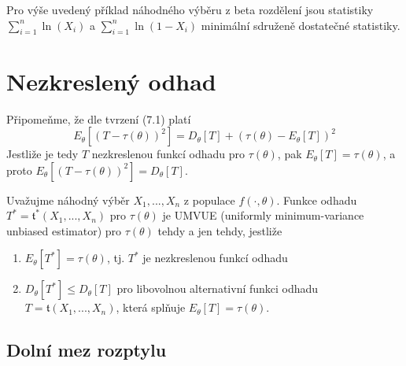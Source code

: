\begin{example}
Pro výše uvedený příklad náhodného výběru z beta rozdělení jsou statistiky $\sum_{i = 1}^n \ln (X_i)$ a $\sum_{i = 1}^n \ln(1 - X_i)$ minimální sdruženě dostatečné statistiky.
\end{example}

\section{Nezkreslený odhad}
 
Připomeňme, že dle tvrzení (7.1) platí
\begin{equation*}
E_{\theta}[(T - \tau(\theta))^2] = D_{\theta}[T] + (\tau(\theta) - E_{\theta}[T])^2
\end{equation*}
Jestliže je tedy $T$ nezkreslenou funkcí odhadu pro $\tau(\theta)$, pak $E_{\theta}[T] = \tau(\theta)$, a proto $E_{\theta}[(T - \tau(\theta))^2] = D_{\theta}[T]$.

\begin{definition}
Uvažujme náhodný výběr $X_1, ..., X_n$ z populace $f(\cdot, \theta)$. Funkce odhadu $T^* = \mathfrak{t}^*(X_1, ..., X_n)$ pro $\tau(\theta)$ je UMVUE (uniformly minimum-variance unbiased estimator) pro $\tau(\theta)$ tehdy a jen tehdy, jestliže
\begin{enumerate}
\item $E_{\theta}[T^*] = \tau(\theta)$, tj. $T^*$ je nezkreslenou funkcí odhadu
\item $D_{\theta}[T^*] \le D_{\theta}[T]$ pro libovolnou alternativní funkci odhadu $T = \mathfrak{t}(X_1, ..., X_n)$, která splňuje $E_{\theta}[T] = \tau(\theta)$.
\end{enumerate}
\end{definition}

\subsection{Dolní mez rozptylu}

